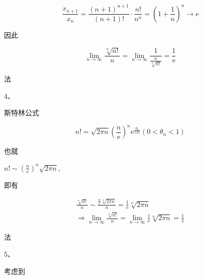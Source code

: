 \documentclass[10pt]{article}
\begin{document}
$$
\frac{x_{n+1}}{x_{n}}=\frac{(n+1)^{n+1}}{(n+1) !} \cdot \frac{n !}{n^{n}}=\left(1+\frac{1}{n}\right)^{n} \rightarrow \mathrm{e}
$$
\begin{CJK}{UTF8}{mj}因此\end{CJK}
$$
\lim _{n \rightarrow \infty} \frac{\sqrt[n]{n !}}{n}=\lim _{n \rightarrow \infty} \frac{1}{\frac{n}{\sqrt[n]{n !}}}=\frac{1}{\mathrm{e}}
$$
\begin{CJK}{UTF8}{mj}法\end{CJK} 4、\begin{CJK}{UTF8}{mj}斯特林公式\end{CJK}
$$
n !=\sqrt{2 \pi n}\left(\frac{n}{\mathrm{e}}\right)^{n} \mathrm{e}^{\frac{\theta_{\mathrm{n}}}{12 n}}\left(0<\theta_{n}<1\right)
$$
\begin{CJK}{UTF8}{mj}也就\end{CJK} $n ! \sim\left(\frac{n}{\mathrm{e}}\right)^{n} \sqrt{2 \pi n}$, \begin{CJK}{UTF8}{mj}即有\end{CJK}
$$
\begin{gathered}
\frac{\sqrt[n]{n !}}{n} \sim \frac{\frac{n}{\mathrm{e}} \sqrt[n]{2 \pi n}}{n}=\frac{1}{\mathrm{e}} \sqrt[n]{2 \pi n} \\
\Rightarrow \lim _{n \rightarrow \infty} \frac{\sqrt[n]{n !}}{n}=\lim _{n \rightarrow \infty} \frac{1}{\mathrm{e}} \sqrt[n]{2 \pi n}=\frac{1}{\mathrm{e}}
\end{gathered}
$$
\begin{CJK}{UTF8}{mj}法\end{CJK} 5、\begin{CJK}{UTF8}{mj}考虑到\end{CJK}
\end{document}
